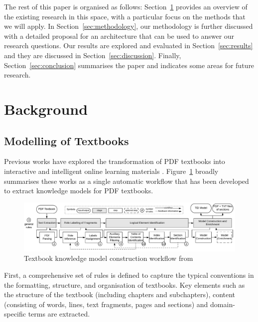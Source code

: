 \documentclass[twocolumn]{article}
\newcommand{\centerimg}[1]{
  \begin{adjustbox}{center} #1 \end{adjustbox}
}
\begin{document}
The rest of this paper is organised as follows: Section~\ref{sec:background} provides an overview of the existing research in this space, with a particular focus on the methods that we will apply. In Section~\ref{sec:methodology}, our methodology is further discussed with a detailed proposal for an architecture that can be used to answer our research questions. Our results are explored and evaluated in Section~\ref{sec:results} and they are discussed in Section~\ref{sec:discussion}. Finally, Section~\ref{sec:conclusion} summarises the paper and indicates some areas for future research.

\section{Background} \label{sec:background}

\subsection{Modelling of Textbooks} \label{sec:modelling-of-textbooks}

Previous works have explored the transformation of PDF textbooks into interactive and intelligent online learning materials \cites{alpizarchacon2019,alpizarchacon2021,alpizarchacon2020, alpizarchacon2022}. Figure~\ref{fig:alpizar-chacon-workflow} broadly summarises these works as a single automatic workflow that has been developed to extract knowledge models for PDF textbooks.

\begin{figure}[h!]
\caption{Textbook knowledge model construction workflow from \textcite{alpizarchacon2020}}
\centerimg{\includegraphics[width=\textwidth]{alpizar-chacon-workflow.png}}
\label{fig:alpizar-chacon-workflow}
\end{figure}


First, a comprehensive set of rules is defined to capture the typical conventions in the formatting, structure, and organisation of textbooks. Key elements such as the structure of the textbook (including chapters and subchapters), content (consisting of words, lines, text fragments, pages and sections) and domain-specific terms are extracted.
\end{document}
